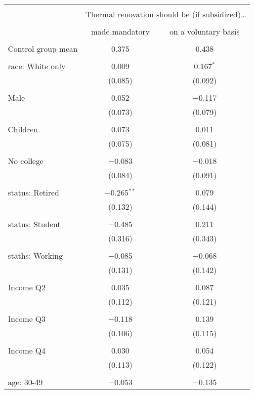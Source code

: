
\begin{tabular}{@{\extracolsep{5pt}}lcc} 
\\[-1.8ex]\hline 
\hline \\[-1.8ex] 
 & \multicolumn{2}{c}{Thermal renovation should be (if subsidized)…} \\ 
\cline{2-3} 
\\[-1.8ex] & made mandatory & on a voluntary basis \\ 
\hline \\[-1.8ex] 
 Control group mean & 0.375 & 0.438  \\ \hline \\[-1.8ex] race: White only & 0.009 & 0.167$^{*}$ \\ 
  & (0.085) & (0.092) \\ 
  & & \\ 
 Male & 0.052 & $-$0.117 \\ 
  & (0.073) & (0.079) \\ 
  & & \\ 
 Children & 0.073 & 0.011 \\ 
  & (0.075) & (0.081) \\ 
  & & \\ 
 No college & $-$0.083 & $-$0.018 \\ 
  & (0.084) & (0.091) \\ 
  & & \\ 
 status: Retired & $-$0.265$^{**}$ & 0.079 \\ 
  & (0.132) & (0.144) \\ 
  & & \\ 
 status: Student & $-$0.485 & 0.211 \\ 
  & (0.316) & (0.343) \\ 
  & & \\ 
 staths: Working & $-$0.085 & $-$0.068 \\ 
  & (0.131) & (0.142) \\ 
  & & \\ 
 Income Q2 & 0.035 & 0.087 \\ 
  & (0.112) & (0.121) \\ 
  & & \\ 
 Income Q3 & $-$0.118 & 0.139 \\ 
  & (0.106) & (0.115) \\ 
  & & \\ 
 Income Q4 & 0.030 & 0.054 \\ 
  & (0.113) & (0.122) \\ 
  & & \\ 
 age: 30-49 & $-$0.053 & $-$0.135 \\ 

\end{tabular}
